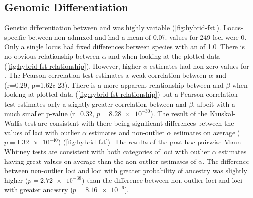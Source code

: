 \subsection{Genomic Differentiation}
Genetic differentiation between \amer and \terr was highly variable (\cref{fig:hybrid-fst}). 
Locus-specific \fst between non-admixed \amer and \terr had a mean 
of 0.07. \fst values for 249 loci were 0. Only a single locus had fixed 
differences between species with an \fst of 1.0. 
There is no obvious relationship between $\alpha$ and \fst when looking 
at the plotted data (\cref{fig:hybrid-fst-relationship}).
However, higher $\alpha$ estimates had non-zero values for \fst.
The Pearson correlation test estimates a weak correlation between $\alpha$ and
\fst (r=0.29, p=1.62e-23). 
There is a more apparent relationship between \fst and $\beta$ when looking at 
plotted data (\cref{fig:hybrid-fst-relationship}) but a Pearson correlation test estimates only 
a slightly greater correlation between \fst and $\beta$, albeit with a much   
smaller p-value (r=0.32, $p=\num{8.28e-30}$). 
The result of the Kruskal-Wallis test are consistent with there being significant 
differences between the \fst values of loci with outlier $\alpha$ estimates
and non-outlier $\alpha$ estimates on average ($p=\num{1.32e-40}$) (\cref{fig:hybrid-fst}).
The results of the post hoc pairwise Mann-Whitney tests are consistent with 
both categories of loci with outlier $\alpha$ estimates  having great \fst values on average than the non-outlier estimates of  
$\alpha$.
The difference between non-outlier loci and loci with greater probability of
\amer ancestry was slightly higher ($p=\num{2.72e-38}$) than the difference between 
non-outlier loci and loci with greater \terr ancestry ($p=\num{8.16e-6}$).





